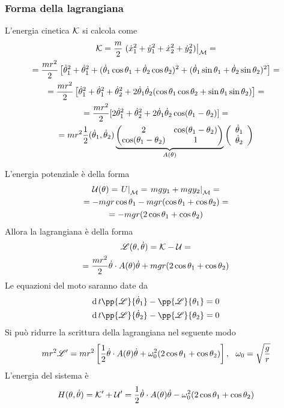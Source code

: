 \documentclass[Main.tex]{subfiles}
\begin{document}
\begin{tema}
\subsubsection*{Forma della lagrangiana}
L'energia cinetica $\mathcal{K}$ si calcola come 
\begin{gather}
	\mathcal{K} = \frac{m}{2} \left. (\dot x_1^2 + \dot y_1^2  + \dot x_2^2 + \dot y_2^2 ) \right|_{\mathcal{M}} = \\=\frac{m r^2}{2} \left [\dot \theta ^2_1 + \dot \theta_1 ^2 +(\dot \theta_1 \cos \theta_1 + \dot \theta_2\cos \theta_2)^2 + ( \dot \theta_1 \sin \theta_1 + \dot \theta_2 \sin \theta_2)^2 \right]=\\
	= \frac{mr^2}{2} \left[ \dot \theta^2_1 + \dot \theta^2_1 + \dot \theta^2 _2 + 2 \dot \theta_1 \dot \theta_2 ( \cos \theta_1 \cos \theta_2 + \sin \theta_1 \sin \theta_2 ) \right] =\\
	= \frac{m r^2}{2} [ 2 \dot \theta_1^2 + \dot \theta_2^2 + 2 \dot \theta_1 \dot \theta_2 \cos ( \theta_1 - \theta_2)]=\\
	= mr^2 \frac{1}{2} (\dot \theta_1, \dot \theta_2) \underbrace{\left( \begin{matrix}
		2 & \cos (\theta_1- \theta_2) \\ \cos (\theta_1-\theta_2) &1
	\end{matrix} \right)}_{A(\theta)} \left( \begin{array}{c} \dot \theta_1 \\ \dot \theta_2  \end{array} \right)
\end{gather}
	
L'energia potenziale è della forma
\begin{gather}
	\mathcal{U}(\theta) = \left. U \right|_{\mathcal{M}} =\left. mgy_1 + mgy_2 \right|_{\mathcal{M}}=\\
=-mgr \cos \theta_1 - mg r ( \cos \theta_1 + \cos \theta _2)=\\
=- mgr ( 2 \cos \theta _1 + \cos \theta _2)	
\end{gather}	
Allora la lagrangiana è della forma
\begin{gather}
	\mathscr{L} (\theta, \dot \theta) = \mathcal{K} -\mathcal{U} = \\
	= \frac{mr^2}{2} \dot \theta \cdot A(\theta) \dot \theta + mgr ( 2 \cos \theta_1 + \cos \theta_2)
\end{gather}
Le equazioni del moto saranno date da
\begin{gather}
	\dd{}{t} \pp{\L}{\dot \theta_1} - \pp{\L}{\theta_1} =0 \\
	\dd{}{t} \pp{\L}{\dot \theta_2} - \pp{\L}{\theta_2} =0 
\end{gather}
Si può ridurre la scrittura della lagrangiana nel seguente modo
\begin{gather}
	mr^2 \L ' = mr^2 \left[ \frac{1}{2} \dot \theta \cdot A(\theta) \dot \theta + \omega^2 _0 (2 \cos \theta_1 + \cos \theta_2) \right], \ \ \omega _0=\sqrt{\frac{g}{r}}
\end{gather}	
L'energia del sistema è
\begin{gather}
	H(\theta, \dot \theta) = \mathcal{K}' + \mathcal{U}' = \frac{1}{2} \dot \theta \cdot A(\theta) \dot \theta - \omega_0^2 ( 2 \cos \theta_1 + \cos \theta_2)
\end{gather}


\end{tema}
\end{document}
